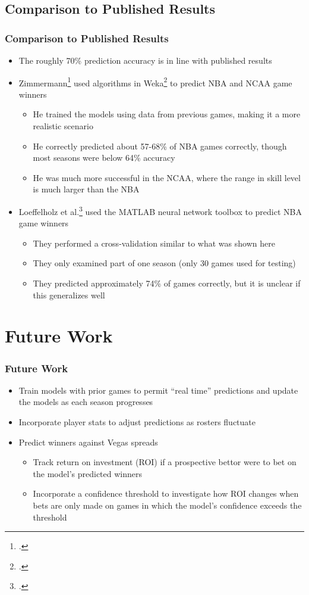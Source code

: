 \documentclass{beamer}
\begin{document}
\subsection{Comparison to Published Results}
\begin{frame}
\frametitle{Comparison to Published Results}
\begin{itemize}
    \item The roughly 70\% prediction accuracy is in line with published results
    \item Zimmermann\footcite{zimmermann} used algorithms in Weka\footcite{witten} to predict NBA and NCAA game winners
    \begin{itemize}
        \item He trained the models using data from previous games, making it a more realistic scenario
        \item He correctly predicted about 57-68\% of NBA games correctly, though most seasons were below 64\% accuracy
        \item He was much more successful in the NCAA, where the range in skill level is much larger than the NBA
    \end{itemize}
    \item Loeffelholz et al.\footcite{loeffelholz} used the MATLAB neural network toolbox to predict NBA game winners
    \begin{itemize}
        \item They performed a cross-validation similar to what was shown here
        \item They only examined part of one season (only 30 games used for testing)
        \item They predicted approximately 74\% of games correctly, but it is unclear if this generalizes well
    \end{itemize}
\end{itemize}
\end{frame}

\section{Future Work}

\begin{frame}[t]
\frametitle{Future Work}
\begin{itemize}
    \item Train models with prior games to permit ``real time'' predictions and update the models as each season progresses
    \item Incorporate player stats to adjust predictions as rosters fluctuate
    \item Predict winners against Vegas spreads
    \begin{itemize}
        \item Track return on investment (ROI) if a prospective bettor were to bet on the model's predicted winners
        \item Incorporate a confidence threshold to investigate how ROI changes when bets are only made on games in which the model's confidence exceeds the threshold
    \end{itemize}
\end{itemize}
\end{frame}
\end{document}
